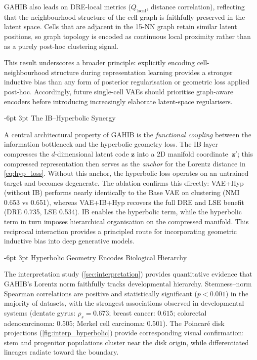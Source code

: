 \documentclass[preprint,12pt]{elsarticle}
\makeatletter
\renewcommand\subsection{\@startsection{subsection}{2}{\z@}%
  {-6pt \@plus -2pt \@minus -2pt}%
  {3pt \@plus 1pt \@minus 1pt}%
  {\normalfont\large\bfseries}}
\newcommand{\bz}{\mathbf{z}}
\makeatother
\begin{document}
GAHIB also leads on DRE-local metrics ($Q_\text{local}$, distance
correlation), reflecting that the neighbourhood structure of the
cell graph is faithfully preserved in the latent space.
Cells that are adjacent in the 15-NN graph retain similar latent positions,
so graph topology is encoded as continuous local proximity rather than as a
purely post-hoc clustering signal.

This result underscores a broader principle: explicitly encoding
cell-neighbourhood structure during representation learning provides a
stronger inductive bias than any form of posterior regularisation or
geometric loss applied post-hoc.
Accordingly, future single-cell VAEs should prioritise graph-aware encoders
before introducing increasingly elaborate latent-space regularisers.

\subsection{The IB--Hyperbolic Synergy}

A central architectural property of GAHIB is the {\em functional coupling}
between the information bottleneck and the hyperbolic geometry loss.
The IB layer compresses the $d$-dimensional latent code $\bz$ into a
2D manifold coordinate~$\bz'$; this compressed representation then
serves as the {\em anchor} for the Lorentz distance in
\cref{eq:hyp_loss}.
Without this anchor, the hyperbolic loss operates on an untrained
target and becomes degenerate.
The ablation confirms this directly:
VAE+Hyp (without IB) performs nearly identically to the Base VAE on
clustering (NMI 0.653 vs 0.651), whereas VAE+IB+Hyp recovers the full
DRE and LSE benefit (DRE 0.735, LSE 0.534).
IB enables the hyperbolic term, while the hyperbolic term in turn imposes
hierarchical organisation on the compressed manifold.
This reciprocal interaction provides a principled route for incorporating
geometric inductive bias into deep generative models.

\subsection{Hyperbolic Geometry Encodes Biological Hierarchy}

The interpretation study (\cref{sec:interpretation}) provides
quantitative evidence that GAHIB's Lorentz norm faithfully tracks
developmental hierarchy.
Stemness--norm Spearman correlations are positive and statistically
significant ($p < 0.001$) in the majority of datasets, with the strongest
associations observed in developmental systems (dentate gyrus:
$\rho_s = 0.673$; breast cancer: $0.615$; colorectal adenocarcinoma:
$0.505$; Merkel cell carcinoma: $0.501$).
The Poincar\'{e} disk projections (\cref{fig:interp_hyperbolic})
provide corresponding visual confirmation: stem and progenitor
populations cluster near the disk origin, while differentiated lineages
radiate toward the boundary.
\end{document}
